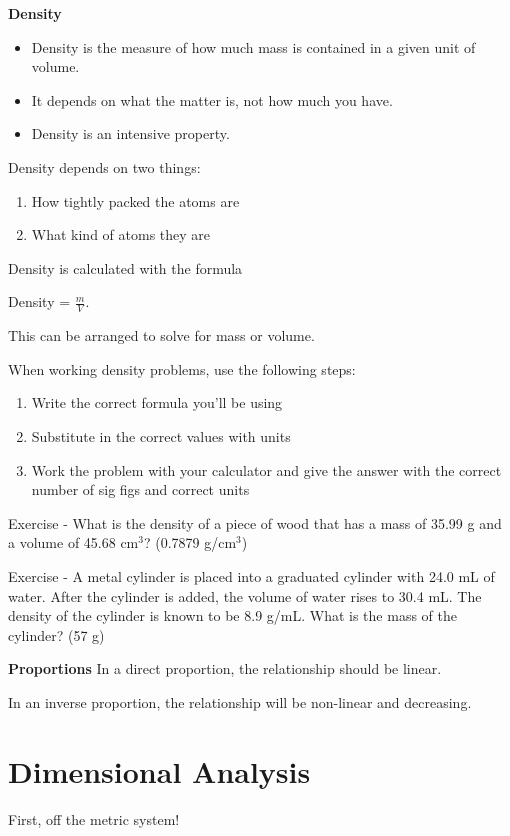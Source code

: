 \documentclass[../hchem.tex]{subfiles}
\begin{document}
\textbf{Density}
\begin{itemize}
    \item Density is the measure of how much mass is contained in a given unit of volume.
    \item It depends on what the matter is, not how much you have.
    \item Density is an intensive property.
\end{itemize}

Density depends on two things:
\begin{enumerate}
    \item How tightly packed the atoms are 
    \item What kind of atoms they are 
\end{enumerate}

Density is calculated with the formula 
\begin{center}
    Density = $\frac{m}{V}$.
    
    This can be arranged to solve for mass or volume.
\end{center}

When working density problems, use the following steps:
\begin{enumerate}
    \item Write the correct formula you'll be using 
    \item Substitute in the correct values with units 
    \item Work the problem with your calculator and give the answer with the correct number of sig figs and correct units 
\end{enumerate}

Exercise - What is the density of a piece of wood that has a mass of 35.99 g and a volume of 45.68 cm$^3$? (0.7879 g/cm$^3$)

Exercise - A metal cylinder is placed into a graduated cylinder with 24.0 mL of water. After the cylinder is added, 
the volume of water rises to 30.4 mL. The density of the cylinder is known to be 8.9 g/mL. What is the mass of the cylinder? (57 g)

\textbf{Proportions}
In a direct proportion, the relationship should be linear.

In an inverse proportion, the relationship will be non-linear and decreasing.

\section{Dimensional Analysis}
First, off the metric system!
\end{document}
